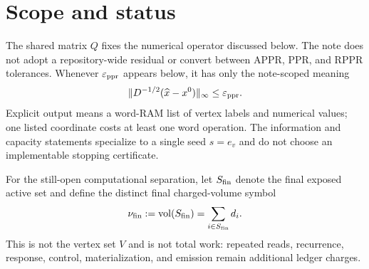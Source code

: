 \section{Scope and status}
\label{sec:scope}



The shared matrix $Q$ fixes the numerical operator discussed below.  The note
does not adopt a repository-wide residual or convert between APPR, PPR, and
RPPR tolerances.  Whenever $\varepsilon_{\mathrm{ppr}}$ appears below, it has only the note-scoped
meaning
\begin{equation}
 \lVert D^{-1/2}(\widehat x-x^0)\rVert_\infty\leq\varepsilon_{\mathrm{ppr}}.
 \label{eq:note-ppr-error}
\end{equation}
Explicit output means a word-RAM list of vertex labels and numerical values;
one listed coordinate costs at least one word operation.  The information and
capacity statements specialize to a single seed $s=e_v$ and do not choose an
implementable stopping certificate.

For the still-open computational separation, let $S_{\rm fin}$ denote the
final exposed active set and define the distinct final charged-volume symbol
\begin{equation}
 \nu_{\rm fin}:=\operatorname{vol}(S_{\rm fin})=\sum_{i\in S_{\rm fin}}d_i.
 \label{eq:final-charged-volume}
\end{equation}
This is not the vertex set $V$ and is not total work: repeated reads,
recurrence, response, control, materialization, and emission remain additional
ledger charges.

